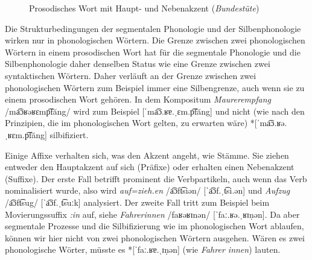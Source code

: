 \begin{figure}[!htpb]
  \centering
  \caption{Prosodisches Wort mit Haupt- und Nebenakzent (\textit{Bundestüte})}
  \label{fig:prosodischeswort}
\end{figure}

Die Strukturbedingungen der segmentalen Phonologie und der Silbenphonologie wirken nur in phonologischen Wörtern.
Die Grenze zwischen zwei phonologischen Wörtern in einem prosodischen Wort hat für die segmentale Phonologie und die Silbenphonologie daher denselben Status wie eine Grenze zwischen zwei syntaktischen Wörtern.
Daher verläuft an der Grenze zwischen zwei phonologischen Wörtern zum Beispiel immer eine Silbengrenze, auch wenn sie zu einem prosodischen Wort gehören.
In dem Kompositum \textit{Maurerempfang} /ma͡ɔʁəʁɛmp͡făng/ wird zum Beispiel [ˈma͡ɔ.ʁɐ.ˌɛm.p͡făng] und nicht (wie nach den Prinzipien, die im phonologischen Wort gelten, zu erwarten wäre) *[ˈma͡ɔ.ʁə.ˌʁɛm.p͡făng] silbifiziert.

Einige Affixe verhalten sich, was den Akzent angeht, wie Stämme.
Sie ziehen entweder den Hauptakzent auf sich (Präfixe) oder erhalten einen Nebenakzent (Suffixe).
Der erste Fall betrifft prominent die Verbpartikeln, auch wenn das Verb nominalisiert wurde, also wird \textit{auf=zieh.en} /a͡ɔft͡siən/ [ˈa͡ɔf.ˌt͡si.ən] und \textit{Aufzug} /a͡ɔft͡sug/ [ˈa͡ɔf.ˌt͡suːk] analysiert.
Der zweite Fall tritt zum Beispiel beim Movierungssuffix \textit{:in} auf, siehe \textit{Fahrerinnen} /faʁəʁɪnən/ [ˈfaː.ʁə.ˌʁɪṇən].
Da aber segmentale Prozesse und die Silbifizierung wie im phonologischen Wort ablaufen, können wir hier nicht von zwei phonologischen Wörtern ausgehen.
Wären es zwei phonologische Wörter, müsste es *[ˈfaː.ʁɐ.ˌɪṇən] (wie \textit{Fahrer innen}) lauten.

